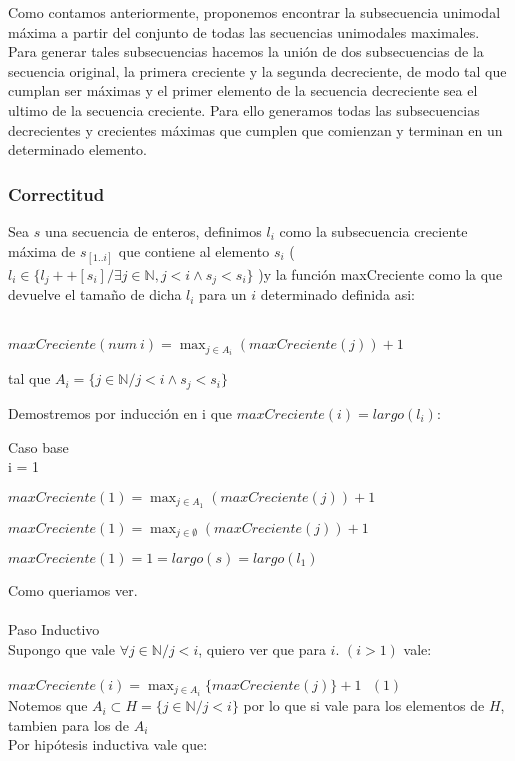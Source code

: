 Como contamos anteriormente, proponemos encontrar la subsecuencia unimodal máxima a partir del conjunto de todas las secuencias unimodales maximales. Para generar tales subsecuencias hacemos la unión de dos subsecuencias de la secuencia original, la primera creciente y la segunda decreciente, de modo tal que cumplan ser máximas y el primer elemento de la secuencia decreciente sea el ultimo de la secuencia creciente. Para ello generamos todas las subsecuencias decrecientes y crecientes máximas que cumplen que comienzan y terminan en un determinado elemento.

\subsubsection{Correctitud}
Sea $s$ una secuencia de enteros, definimos $l_i$ como la subsecuencia creciente máxima de $s_[1..i]$ que contiene al elemento $s_i$ ($l_i \in
  \{l_j ++ [s_i] / \exists j \in \mathbb{N}, j < i \land s_j < s_i\}$ )y la función maxCreciente como la que devuelve el tamaño de dicha $l_i$ para un $i$ determinado definida asi:\\
\\
    \centerline{$ \displaystyle maxCreciente(num\ i) = \max_{j \in A_i} (maxCreciente(j)) + 1$} 
    \centerline{tal que $A_i = \{ j \in \mathbb{N} / j < i \land s_j < s_i \}$}

Demostremos por inducción en i que $maxCreciente(i) = largo(l_i)$:

Caso base\\
i = 1 \\
\centerline{$\displaystyle maxCreciente(1) = \max_{j \in A_1} (maxCreciente(j)) + 1$}
\centerline{$\displaystyle maxCreciente(1) = \max_{j \in \emptyset} (maxCreciente(j)) + 1$}
\centerline{$\displaystyle maxCreciente(1) = 1 = largo(s) = largo(l_1)$} 
Como queriamos ver.\\
\\
Paso Inductivo\\
Supongo que vale $\forall j \in \mathbb{N} / j < i$, quiero ver que para $i$. $(i > 1)$ vale:\\
\\
$\displaystyle maxCreciente(i) = \max_{j \in A_i} \{maxCreciente(j)\} + 1 \ \ \ (1)$\\

Notemos que $ A_i \subset H = \{ j \in \mathbb{N} / j < i\} $ por lo que si vale para los elementos de $H$, tambien para los de $A_i$\\
Por hipótesis inductiva vale que:\\

